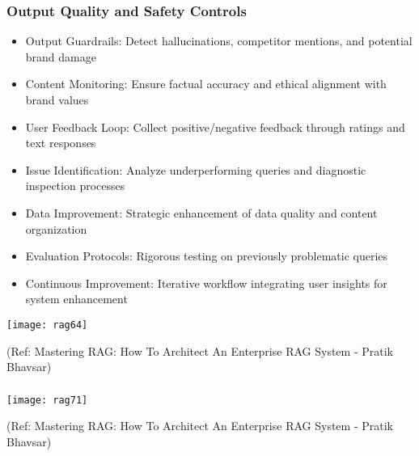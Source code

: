 \begin{frame}[fragile]\frametitle{Output Quality and Safety Controls}
      \begin{itemize}
        \item Output Guardrails: Detect hallucinations, competitor mentions, and potential brand damage
        \item Content Monitoring: Ensure factual accuracy and ethical alignment with brand values
        \item User Feedback Loop: Collect positive/negative feedback through ratings and text responses
        \item Issue Identification: Analyze underperforming queries and diagnostic inspection processes
        \item Data Improvement: Strategic enhancement of data quality and content organization
        \item Evaluation Protocols: Rigorous testing on previously problematic queries
        \item Continuous Improvement: Iterative workflow integrating user insights for system enhancement
      \end{itemize}
	  
	\begin{center}
	\texttt{[image: rag64]}
	
	{\tiny (Ref: Mastering RAG: How To Architect An Enterprise RAG System - Pratik Bhavsar)}
	
	\end{center}	  
\end{frame}

\begin{frame}[fragile]\frametitle{}

	\begin{center}
	\texttt{[image: rag71]}
	
	{\tiny (Ref: Mastering RAG: How To Architect An Enterprise RAG System - Pratik Bhavsar)}
	
	\end{center}
	
	
\end{frame}


